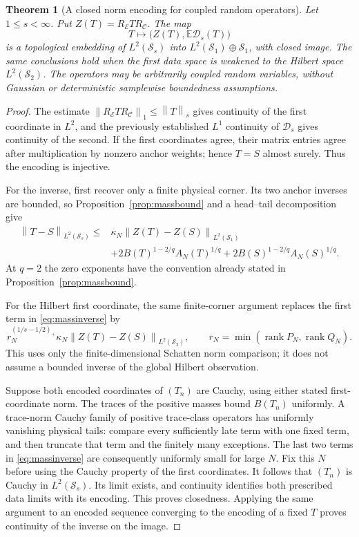 \documentclass[11pt,a4paper]{amsart}
\numberwithin{equation}{section}
\newtheorem{theorem}{Theorem}[section]
\theoremstyle{definition}
\theoremstyle{remark}
\newcommand{\E}{\mathbb E}
\newcommand{\cC}{\mathcal C}
\newcommand{\cE}{\mathcal E}
\newcommand{\Sch}{\mathcal S}
\DeclareMathOperator{\rank}{rank}
\newcommand{\norm}[1]{\left\lVert#1\right\rVert}
\newcommand{\Dens}{\mathscr D_s}
\begin{document}
\begin{theorem}[A closed norm encoding for coupled random operators]\label{thm:massclosed}
Let $1\le s<\infty$. Put $Z(T)=R_\cE TR_\cC$. The map
\begin{equation}\label{eq:masscode}
 T\longmapsto\big(Z(T),\E\Dens(T)\big)
\end{equation}
is a topological embedding of $L^2(\Sch_s)$ into
$L^2(\Sch_1)\oplus\Sch_1$, with closed image. The same conclusions hold when the first data space is weakened to the Hilbert space $L^2(\Sch_2)$. The operators may be arbitrarily coupled random variables, without Gaussian or deterministic samplewise boundedness assumptions.
\end{theorem}
\begin{proof}
The estimate $\norm{R_\cE TR_\cC}_1\le\norm T_s$ gives continuity of the first coordinate in $L^2$, and the previously established $L^1$ continuity of $\Dens$ gives continuity of the second. If the first coordinates agree, their matrix entries agree after multiplication by nonzero anchor weights; hence $T=S$ almost surely. Thus the encoding is injective.

For the inverse, first recover only a finite physical corner. Its two anchor inverses are bounded, so Proposition~\ref{prop:massbound} and a head--tail decomposition give
\begin{equation}\label{eq:massinverse}
 \begin{split}
 \norm{T-S}_{L^2(\Sch_s)}\le{}&
 \kappa_N\norm{Z(T)-Z(S)}_{L^2(\Sch_1)}\\
 &+2B(T)^{1-2/q}A_N(T)^{1/q}
  +2B(S)^{1-2/q}A_N(S)^{1/q}.
 \end{split}
\end{equation}
At $q=2$ the zero exponents have the convention already stated in Proposition~\ref{prop:massbound}.

For the Hilbert first coordinate, the same finite-corner argument replaces the first term in \eqref{eq:massinverse} by
\[
 r_N^{(1/s-1/2)_+}\kappa_N\norm{Z(T)-Z(S)}_{L^2(\Sch_2)},
 \qquad r_N=\min(\rank P_N,\rank Q_N).
\]
This uses only the finite-dimensional Schatten norm comparison; it does not assume a bounded inverse of the global Hilbert observation.

Suppose both encoded coordinates of $(T_n)$ are Cauchy, using either stated first-coordinate norm. The traces of the positive masses bound $B(T_n)$ uniformly. A trace-norm Cauchy family of positive trace-class operators has uniformly vanishing physical tails: compare every sufficiently late term with one fixed term, and then truncate that term and the finitely many exceptions. The last two terms in \eqref{eq:massinverse} are consequently uniformly small for large $N$. Fix this $N$ before using the Cauchy property of the first coordinates. It follows that $(T_n)$ is Cauchy in $L^2(\Sch_s)$. Its limit exists, and continuity identifies both prescribed data limits with its encoding. This proves closedness. Applying the same argument to an encoded sequence converging to the encoding of a fixed $T$ proves continuity of the inverse on the image.
\end{proof}
\end{document}

